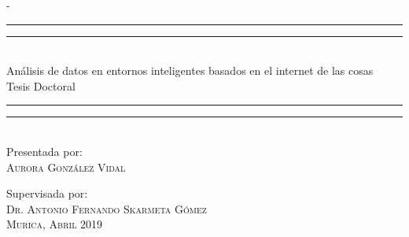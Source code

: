 \begin{titlingpage}
\begin{adjustwidth*}{\unitlength}{-\unitlength}
\begin{center}
\rule[0.5ex]{\linewidth}{2pt}\vspace*{-\baselineskip}\vspace*{3.2pt}
\rule[0.5ex]{\linewidth}{1pt}\\[\baselineskip]
{\HUGE Análisis de datos en entornos inteligentes basados en el internet de las cosas}\\[4mm]
%

{\Large Tesis Doctoral}\\
\rule[0.5ex]{\linewidth}{1pt}\vspace*{-\baselineskip}\vspace{3.2pt}
\rule[0.5ex]{\linewidth}{2pt}\\
\vspace{8mm}
{\large Presentada por:}\\
\vspace{2.5mm}
{\large\textsc{Aurora Gonz\'alez Vidal}}\\
\vspace{6mm}

{\large Supervisada por:}\\
\vspace{2.5mm}
{\large\textsc{Dr. Antonio Fernando Skarmeta G\'omez}}\\

\vspace{9mm}
{\large\textsc{Murica, Abril 2019}}
\vspace{12mm}
\end{center}
\end{adjustwidth*}
\end{titlingpage}